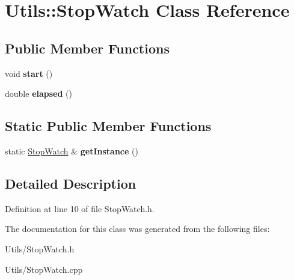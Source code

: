 \hypertarget{classUtils_1_1StopWatch}{}\section{Utils\+:\+:Stop\+Watch Class Reference}
\label{classUtils_1_1StopWatch}
\subsection*{Public Member Functions}
\begin{DoxyCompactItemize}
\item 
\mbox{\label{classUtils_1_1StopWatch_a6307657657fdea9e3fbd6894f93f3949}} 
void {\bfseries start} ()
\item 
\mbox{\label{classUtils_1_1StopWatch_a13136ad8120b345c4d16f7f600867246}} 
double {\bfseries elapsed} ()
\end{DoxyCompactItemize}
\subsection*{Static Public Member Functions}
\begin{DoxyCompactItemize}
\item 
\mbox{\label{classUtils_1_1StopWatch_a17a03335cbdac0082b880a969b59a22f}} 
static \hyperlink{classUtils_1_1StopWatch}{Stop\+Watch} \& {\bfseries get\+Instance} ()
\end{DoxyCompactItemize}


\subsection{Detailed Description}


Definition at line 10 of file Stop\+Watch.\+h.



The documentation for this class was generated from the following files\+:\begin{DoxyCompactItemize}
\item 
Utils/Stop\+Watch.\+h\item 
Utils/Stop\+Watch.\+cpp\end{DoxyCompactItemize}
